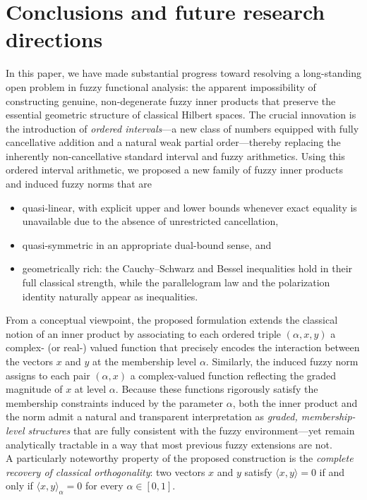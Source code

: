 \documentclass[preprint,12pt]{elsarticle}
\theoremstyle{definition}
\begin{document}
\section{Conclusions and future research directions}
\label{sec:conclusions}
In this paper, we have made substantial progress toward resolving a long-standing open problem in fuzzy functional analysis: the apparent impossibility of constructing genuine, non-degenerate fuzzy inner products that preserve the essential geometric structure of classical Hilbert spaces. The crucial innovation is the introduction of \emph{ordered intervals}---a new class of  numbers equipped with fully cancellative addition and a natural weak partial order---thereby replacing the inherently non-cancellative standard interval and fuzzy arithmetics.
Using this ordered interval arithmetic, we proposed a new family of fuzzy inner products and induced fuzzy norms that are
\begin{itemize}
	\item  quasi-linear, with  explicit upper and lower bounds whenever exact equality is unavailable due to the absence of unrestricted cancellation,

	\item quasi-symmetric in an appropriate dual-bound sense, and
	\item geometrically rich: the Cauchy--Schwarz and Bessel inequalities hold in their full classical strength, while the parallelogram law and the polarization identity naturally appear as  inequalities.
\end{itemize}
From a conceptual viewpoint, the proposed formulation extends the classical notion of an inner product by associating to each ordered triple $(\alpha, x, y)$ a complex- (or real-) valued function that precisely encodes the interaction between the vectors $x$ and $y$ at the membership level $\alpha$. Similarly, the induced fuzzy norm assigns to each pair $(\alpha, x)$ a complex-valued function reflecting the graded magnitude of $x$ at level $\alpha$. Because these functions rigorously satisfy the membership constraints induced by the parameter $\alpha$, both the inner product and the norm admit a natural and transparent interpretation as \emph{graded, membership-level structures} that are fully consistent with the fuzzy environment—yet remain analytically tractable in a way that most previous fuzzy extensions are not.\\
A particularly noteworthy property of the proposed construction is the \emph{complete recovery of classical orthogonality}: two vectors $x$ and $y$ satisfy $\langle x, y \rangle = 0$  if and only if $\langle x, y \rangle_\alpha = 0$ for every $\alpha \in [0,1]$.
\end{document}
